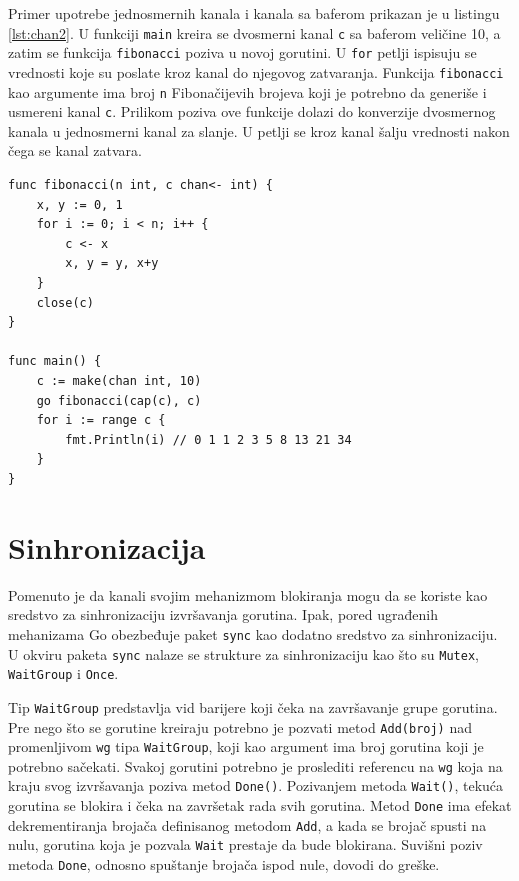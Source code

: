 \documentclass[12pt,oneside]{memoir}
\begin{document}
Primer upotrebe jednosmernih kanala i kanala sa baferom prikazan je u listingu \ref{lst:chan2}. U funkciji \texttt{main} kreira se dvosmerni kanal \texttt{c} sa baferom veličine 10, a zatim se funkcija \texttt{fibonacci} poziva u novoj gorutini. U \texttt{for} petlji ispisuju se vrednosti koje su poslate kroz kanal do njegovog zatvaranja. Funkcija \texttt{fibonacci} kao argumente ima  broj \texttt{n} Fibonačijevih brojeva koji je potrebno da generiše i usmereni kanal \texttt{c}. Prilikom poziva ove funkcije dolazi do konverzije dvosmernog kanala u jednosmerni kanal za slanje. U petlji se kroz kanal šalju vrednosti nakon čega se kanal zatvara.

\begin{center}
\begin{lstlisting}[caption=Primer upotrebe jednosmernog kanala i kanala sa baferom, label={lst:chan2},  backgroundcolor=\color{background}]
func fibonacci(n int, c chan<- int) {
	x, y := 0, 1
	for i := 0; i < n; i++ {
		c <- x
		x, y = y, x+y
	}
	close(c)
}

func main() {
	c := make(chan int, 10)
	go fibonacci(cap(c), c)
	for i := range c {
		fmt.Println(i) // 0 1 1 2 3 5 8 13 21 34
	}
}
\end{lstlisting}
\end{center}

\section{Sinhronizacija}

Pomenuto je da kanali svojim mehanizmom blokiranja mogu da se koriste kao sredstvo za sinhronizaciju izvršavanja gorutina. Ipak, pored ugrađenih mehanizama Go obezbeđuje paket \texttt{sync} kao dodatno sredstvo za sinhronizaciju. U okviru paketa \texttt{sync} nalaze se strukture za sinhronizaciju kao što su \texttt{Mutex}, \texttt{WaitGroup} i \texttt{Once}.

Tip \texttt{WaitGroup} predstavlja vid barijere koji čeka na završavanje grupe gorutina. Pre nego što se gorutine kreiraju potrebno je pozvati metod \texttt{Add(broj)} nad promenljivom \texttt{wg} tipa \texttt{WaitGroup}, koji kao argument ima broj gorutina koji je potrebno sačekati. Svakoj gorutini potrebno je proslediti referencu na \texttt{wg} koja na kraju svog izvršavanja poziva metod \texttt{Done()}. Pozivanjem metoda \texttt{Wait()}, tekuća gorutina se blokira i čeka na završetak rada svih gorutina.  Metod \texttt{Done} ima efekat dekrementiranja brojača definisanog metodom \texttt{Add}, a kada se brojač spusti na nulu, gorutina koja je pozvala \texttt{Wait} prestaje da bude blokirana. Suvišni poziv metoda \texttt{Done}, odnosno spuštanje brojača ispod nule, dovodi do greške. 
\end{document}
